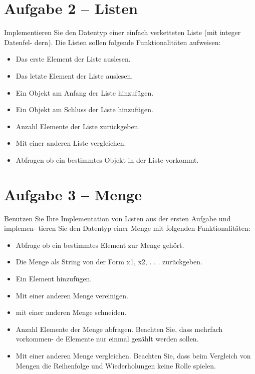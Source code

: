 \section*{Aufgabe 2 – Listen}
Implementieren Sie den Datentyp einer einfach verketteten Liste (mit integer Datenfel- dern). Die Listen sollen folgende Funktionalitäten aufweisen:\\

\begin{itemize}
	\item
		Das erste Element der Liste auslesen.
	\item
		Das letzte Element der Liste auslesen.
	\item
		Ein Objekt am Anfang der Liste hinzufügen.
	\item
		Ein Objekt am Schluss der Liste hinzufügen.
	\item
		Anzahl Elemente der Liste zurückgeben.
	\item
		Mit einer anderen Liste vergleichen.
	\item
		Abfragen ob ein bestimmtes Objekt in der Liste vorkommt.
\end{itemize}




\newpage

\section*{Aufgabe 3 – Menge}
Benutzen Sie Ihre Implementation von Listen aus der ersten Aufgabe und implemen- tieren Sie den Datentyp einer Menge mit folgenden Funktionalitäten:

\begin{itemize}
	\item
		Abfrage ob ein bestimmtes Element zur Menge gehört.
	\item
		Die Menge als String von der Form {x1, x2, . . . } zurückgeben.
	\item
		Ein Element hinzufügen.
	\item
		Mit einer anderen Menge vereinigen.
	\item
		mit einer anderen Menge schneiden.
	\item
		Anzahl Elemente der Menge abfragen. Beachten Sie, dass mehrfach vorkommen- de Elemente nur einmal gezählt werden sollen.
	\item
		Mit einer anderen Menge vergleichen. Beachten Sie, dass beim Vergleich von Mengen die Reihenfolge und Wiederholungen keine Rolle spielen.
		
\end{itemize}


